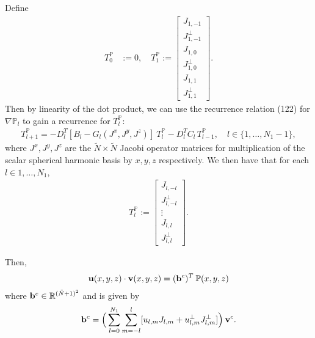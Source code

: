 \documentclass[11pt, oneside]{article}   	%
\newcommand{\R}{\mathbb{R}}
\newcommand{\bigP}{\mathbb{P}}
\newcommand{\gradPl}{\nabla\mathbb{P}_l}
\newcommand{\Dlt}{D^T_l}
\begin{document}
Define
\begin{align}
T^\bigP_0 &:= 0, \quad
T^\bigP_1 := \begin{bmatrix}
			J_{1,-1} \\
			J^\perp_{1,-1} \\
			J_{1,0} \\
			J^\perp_{1,0} \\
			J_{1,1} \\
			J^\perp_{1,1}
	  	\end{bmatrix}.
\end{align}
Then by linearity of the dot product, we can use the recurrence relation (122) for \(\gradPl\) to gain a recurrence for \(T^\bigP_l\):
\begin{align}
T^\bigP_{l+1} = -\Dlt [B_l-G_l(J^x, J^y, J^z)] \: T^\bigP_l - \Dlt C_l  \, T^\bigP_{l-1}, \quad l \in \{1,\dots,N_1-1\},
\end{align}
where \(J^x, J^y, J^z\) are the \(\tilde{N} \times \tilde{N}\) Jacobi operator matrices for multiplication of the scalar spherical harmonic basis by \(x, y, z\) respectively. We then have that for each \(l \in {1,\dots,N_1}\),
\begin{align}
T^\bigP_l := \begin{bmatrix}
			J_{l,-l} \\
			J^\perp_{l,-l} \\
			\vdots \\
			J_{l,l} \\
			J^\perp_{l,l}
	  	\end{bmatrix}.
\end{align}

Then, 
\begin{align}
\bold{u}(x,y,z) \cdot \bold{v}(x,y,z) = (\bold{b}^c)^T  \: \bigP(x,y,z)
\end{align}
where \(\bold{b}^c \in \R^{(\tilde{N}+1)^2}\) and is given by
\begin{align}
\bold{b}^c = \Big(\sum_{l=0}^{N_1} \sum_{m=-l}^{l} [ u_{l,m} J_{l,m} + u^{\perp}_{l,m} J^\perp_{l,m} ] \Big) \: \bold{v}^c.
\end{align}



\end{document}
